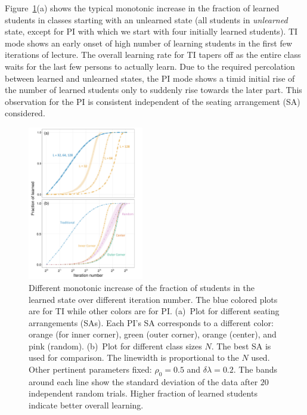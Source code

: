 \documentclass[twocolumn,secnumarabic,amssymb, nobibnotes, aps, prd]{revtex4-2}
\begin{document}
        Figure~\ref{fig:comparison size}(a) shows the typical monotonic increase in the fraction of learned students in classes starting with an unlearned state (all students in {\it unlearned} state, except for PI with which we start with four initially learned students).
        TI mode shows an early onset of high number of learning students in the first few iterations of lecture.
        The overall learning rate for TI tapers off as the entire class waits for the last few persons to actually learn.
        Due to the required percolation between learned and unlearned states, the PI mode shows a timid initial rise of the number of learned students only to suddenly rise towards the later part.
        This observation for the PI is consistent independent of the seating arrangement (SA) considered.
        \begin{figure}[htbp]
        \centering
        \includegraphics[width=0.45\textwidth]{figures/figure-3.png}
        \caption{
        Different monotonic increase of the fraction of students in the learned state over different iteration number.
        The blue colored plots are for TI while other colors are for PI.
        (a)~Plot for different seating arrangements (SAs).
        Each PI's SA corresponds to a different color: orange (for inner corner), green (outer corner), orange (center), and pink (random).
        (b)~Plot for different class sizes $N$.
        The best SA is used for comparison.
        The linewidth is proportional to the $N$ used. Other pertinent parameters fixed: $\rho_0=0.5$ and $\delta\!\lambda=0.2$.
        The bands around each line show the standard deviation of the data after $20$ independent random trials.
        Higher fraction of learned students indicate better overall learning.
        }
        \label{fig:comparison size}
        \end{figure}
        
\end{document}
